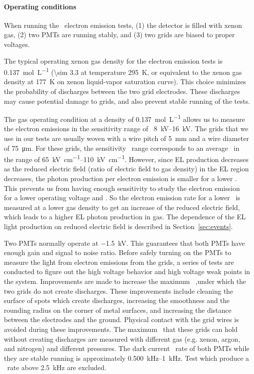 \paragraph{Operating conditions} %
When running the \gtest\ electron emission tests, (1) the detector is filled with xenon gas, (2) two PMTs are running stably, and (3) two grids are biased to proper voltages. 

The typical operating xenon gas density for the electron emission tests is \SI{0.137}{\mole\per\liter}  (\SI{\sim 3.3}{\bara} at temperature \SI{295}{\kelvin}, or equivalent to the xenon gas density at \SI{177}{\kelvin} on xenon liquid-vapor saturation curve). 
This choice minimizes the probability of discharges between the two grid electrodes. %
These discharges may cause potential damage to grids, and also prevent stable running of the tests. 

The gas operating condition at a density of \SI{0.137}{\mole\per\liter} allows us to measure the electron emissions in the sensitivity range of \opdv\ \SIrange{8}{16}{\kV}. The grids that we use in our tests are usually woven with a wire pitch of \SI{5}{mm} and a wire diameter of  \SI{75}{\um}. For these grids, the sensitivity \opdv\ range corresponds to an average \wsef\ in the range of \SIrange{65}{110}{\kV\per\cm}. However, since EL production decreases as the reduced electric field (ratio of electric field to gas density) in the EL region decreases, the photon production per electron emission is smaller for a lower \opdv . This prevents us from having enough sensitivity to study the electron emission for a lower operating voltage and \wsef . So the electron emission rate for a lower \wsef\ is measured at a lower gas density to get an increase of the reduced electric field, which leads to a higher EL photon production in gas. The dependence of the EL light production on reduced electric field is described in Section~\ref{sec:events}.

Two PMTs normally operate at \SI{-1.5}{\kV}. This guarantees that both PMTs have enough gain and signal to noise ratio. Before safely turning on the PMTs to measure the light from electron emissions from the grids, a series of tests are conducted to figure out the high voltage behavior and high voltage weak points in the system. Improvements are made to increase the maximum \opvtvb\ ,under which the two grids do not create discharges. These improvements include cleaning the surface of spots which create discharges, increasing the smoothness and the rounding radius on the corner of metal surfaces, and increasing the distance between the electrodes and the ground. Physical contact with the grid wires is avoided during these improvements. The maximum \opvtvb\ that these grids can hold without creating discharges are measured with different gas (e.g. xenon, argon, and nitrogen) and different pressures. The dark current \sphe\ rate of both PMTs while they are stable running is approximately \SIrange{0.500}{1}{\kHz}. Test which produce a \sphe\ rate above \SI{2.5}{\kHz} are excluded. 

